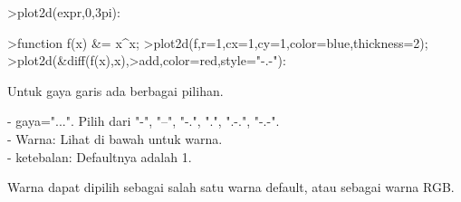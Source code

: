 \documentclass[a4paper,10pt]{article}
\begin{document}
\begin{eulernotebook}
\begin{eulercomment}
\begin{eulercomment}
\begin{eulercomment}
\begin{eulercomment}
\begin{eulercomment}
\begin{eulercomment}
\begin{eulercomment}
\begin{eulercomment}
\begin{eulercomment}
\begin{eulercomment}
\begin{eulercomment}
\begin{eulercomment}
\begin{eulercomment}
\begin{eulercomment}
\begin{eulercomment}
\begin{eulercomment}
\begin{eulercomment}
\begin{eulercomment}
\begin{eulercomment}
\begin{eulercomment}
\begin{eulercomment}
\begin{eulercomment}
\begin{eulercomment}
\begin{eulercomment}
\begin{eulercomment}
\begin{eulercomment}
\begin{eulercomment}
\begin{eulercomment}
\begin{eulercomment}
\begin{eulercomment}
\begin{eulercomment}
\begin{eulercomment}
\begin{eulercomment}
\begin{eulercomment}
\begin{eulercomment}
\begin{eulercomment}
\begin{euleroutput}
\end{euleroutput}
\begin{eulerprompt}
>plot2d(expr,0,3pi):
\end{eulerprompt}
\begin{eulerprompt}
>function f(x) &= x^x;
>plot2d(f,r=1,cx=1,cy=1,color=blue,thickness=2);
>plot2d(&diff(f(x),x),>add,color=red,style="-.-"):
\end{eulerprompt}
\begin{eulercomment}
Untuk gaya garis ada berbagai pilihan.

- gaya="...". Pilih dari "-", "--", "-.", ".", ".-.", "-.-".\\
- Warna: Lihat di bawah untuk warna.\\
- ketebalan: Defaultnya adalah 1.

Warna dapat dipilih sebagai salah satu warna default, atau sebagai
warna RGB.


\end{eulercomment}
\end{eulercomment}
\end{eulercomment}
\end{eulercomment}
\end{eulercomment}
\end{eulercomment}
\end{eulercomment}
\end{eulercomment}
\end{eulercomment}
\end{eulercomment}
\end{eulercomment}
\end{eulercomment}
\end{eulercomment}
\end{eulercomment}
\end{eulercomment}
\end{eulercomment}
\end{eulercomment}
\end{eulercomment}
\end{eulercomment}
\end{eulercomment}
\end{eulercomment}
\end{eulercomment}
\end{eulercomment}
\end{eulercomment}
\end{eulercomment}
\end{eulercomment}
\end{eulercomment}
\end{eulercomment}
\end{eulercomment}
\end{eulercomment}
\end{eulercomment}
\end{eulercomment}
\end{eulercomment}
\end{eulercomment}
\end{eulercomment}
\end{eulercomment}
\end{eulercomment}
\end{eulernotebook}
\end{document}
